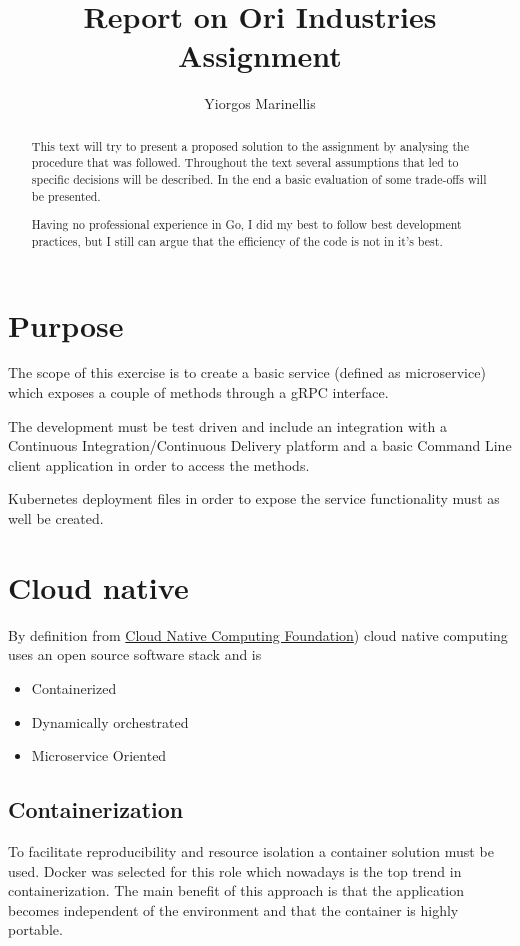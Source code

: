 \documentclass[a4paper,10pt]{article}
\title{Report on Ori Industries Assignment}
\author{Yiorgos Marinellis}
\begin{document}
\maketitle

\begin{abstract}
This text will try to present a proposed solution to the assignment
by analysing the procedure that was followed. Throughout the text
several assumptions that led to specific decisions will be described.
In the end a basic evaluation of some trade-offs will be presented.

Having no professional experience in Go, I did my best to follow best development practices,
but I still can argue that the efficiency of the code is not in it's best. 

\end{abstract}

\section{Purpose}
The scope of this exercise is to create a basic service (defined as microservice) 
which exposes a couple of methods through a gRPC interface. 

The development must be test driven and include an integration with a Continuous Integration/Continuous Delivery platform and a basic Command Line client application 
in order to access the methods.

Kubernetes deployment files in order to expose the service functionality must as well 
be created.


\section{Cloud native}
By definition from \href{https://github.com/cncf/toc/blob/master/DEFINITION.md}{Cloud Native Computing Foundation}) cloud native computing uses an open source software 
stack and is 
\begin{itemize}
    \item Containerized
    \item Dynamically orchestrated
    \item Microservice Oriented
\end{itemize}

\subsection{Containerization}
To facilitate reproducibility and resource isolation a container solution must be used.
Docker was selected for this role which nowadays is the top trend in containerization. 
The main benefit of this approach is that the application becomes independent of the environment and that the container is highly portable.
\end{document}
